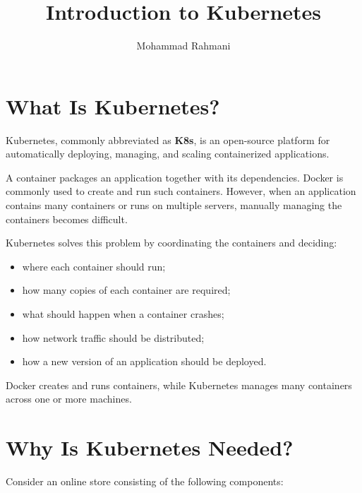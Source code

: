 \documentclass[a4paper]{article}
\title{Introduction to Kubernetes}
\date{}
\author{Mohammad Rahmani}
\begin{document}
    
    \maketitle
    
    
    \section{What Is Kubernetes?}
        
        Kubernetes, commonly abbreviated as \textbf{K8s}, is an open-source platform
        for automatically deploying, managing, and scaling containerized applications.
        
        A container packages an application together with its dependencies. Docker is
        commonly used to create and run such containers. However, when an application
        contains many containers or runs on multiple servers, manually managing the
        containers becomes difficult.
        
        Kubernetes solves this problem by coordinating the containers and deciding:
        
        \begin{itemize}
            \item where each container should run;
            \item how many copies of each container are required;
            \item what should happen when a container crashes;
            \item how network traffic should be distributed;
            \item how a new version of an application should be deployed.
        \end{itemize}
        
        \begin{tcolorbox}[
            enhanced,
            colback=blue!5,
            colframe=blue!50!black,
            title=Simple Definition
        ]
            Docker creates and runs containers, while Kubernetes manages many containers
            across one or more machines.
        \end{tcolorbox}
    
    
    \section{Why Is Kubernetes Needed?}
        
        Consider an online store consisting of the following components:
        
\end{document}

